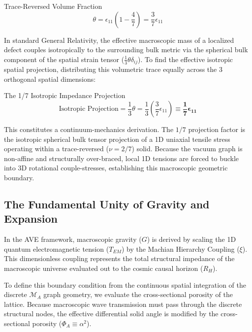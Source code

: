 \begin{resultbox}{Trace-Reversed Volume Fraction}
\begin{equation}
\theta=\epsilon_{11}\left(1-\frac{4}{7}\right)=\frac{3}{7}\epsilon_{11}
\end{equation}
\end{resultbox}

In standard General Relativity, the effective macroscopic mass of a localized defect couples isotropically to the surrounding bulk metric via the spherical bulk component of the spatial strain tensor ($\frac{1}{3}\theta\delta_{ij}$). To find the effective isotropic spatial projection, distributing this volumetric trace equally across the 3 orthogonal spatial dimensions:

\begin{resultbox}{The 1/7 Isotropic Impedance Projection}
\begin{equation}
\text{Isotropic Projection} = \frac{1}{3}\theta = \frac{1}{3}\left(\frac{3}{7}\epsilon_{11}\right) \equiv \mathbf{\frac{1}{7}\epsilon_{11}}
\end{equation}
\end{resultbox}

This constitutes a continuum-mechanics derivation. The $1/7$ projection factor is the isotropic spherical bulk tensor projection of a 1D uniaxial tensile stress operating within a trace-reversed ($\nu=2/7$) solid. Because the vacuum graph is non-affine and structurally over-braced, local 1D tensions are forced to buckle into 3D rotational couple-stresses, establishing this macroscopic geometric boundary.

\subsection{The Fundamental Unity of Gravity and Expansion}

In the AVE framework, macroscopic gravity ($G$) is derived by scaling the 1D quantum electromagnetic tension ($T_{EM}$) by the Machian Hierarchy Coupling ($\xi$). This dimensionless coupling represents the total structural impedance of the macroscopic universe evaluated out to the cosmic causal horizon ($R_{H}$).

To define this boundary condition from the continuous spatial integration of the discrete $\mathcal{M}_{A}$ graph geometry, we evaluate the cross-sectional porosity of the lattice. Because macroscopic wave transmission must pass through the discrete structural nodes, the effective differential solid angle is modified by the cross-sectional porosity ($\Phi_{A}\equiv\alpha^{2}$).

